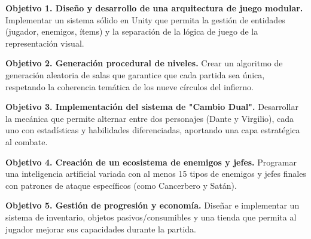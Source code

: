 \begin{description}
\item \textbf{Objetivo 1. Diseño y desarrollo de una arquitectura de juego modular.} Implementar un sistema sólido en Unity que permita la gestión de entidades (jugador, enemigos, ítems) y la separación de la lógica de juego de la representación visual.
\item \textbf{Objetivo 2. Generación procedural de niveles.} Crear un algoritmo de generación aleatoria de salas que garantice que cada partida sea única, respetando la coherencia temática de los nueve círculos del infierno.
\item \textbf{Objetivo 3. Implementación del sistema de "Cambio Dual".} Desarrollar la mecánica que permite alternar entre dos personajes (Dante y Virgilio), cada uno con estadísticas y habilidades diferenciadas, aportando una capa estratégica al combate.
\item \textbf{Objetivo 4. Creación de un ecosistema de enemigos y jefes.} Programar una inteligencia artificial variada con al menos 15 tipos de enemigos y jefes finales con patrones de ataque específicos (como Cancerbero y Satán).
\item \textbf{Objetivo 5. Gestión de progresión y economía.} Diseñar e implementar un sistema de inventario, objetos pasivos/consumibles y una tienda que permita al jugador mejorar sus capacidades durante la partida.
\end{description}